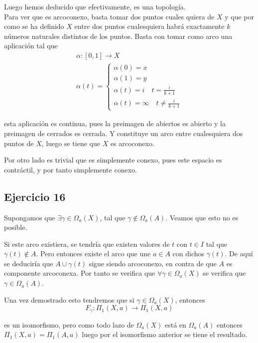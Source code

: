\documentclass{article}
\begin{document}
Luego hemos deducido que efectivamente, es una topología.\\

Para ver que es arcoconexo, basta tomar dos puntos cuales quiera de $X$ y que por como se ha definido $X$ entre dos puntos cualesquiera habrá exactamente $k$ números naturales distintos de los puntos. Basta con tomar como arco una aplicación tal que 
\begin{gather*}
\alpha:[0,1]\rightarrow X\\
\alpha(t)=\left\lbrace\begin{array}{c}
\alpha(0)=x\\
\alpha(1)=y\\
\alpha(t)=i \quad t=\frac{i}{k+1}\\
\alpha(t)=\infty \quad t\neq \frac{i}{k+1}
\end{array}\right.
\end{gather*}

esta aplicación es continua, pues la preimagen de abiertos es abierto y la preimagen de cerrados es cerrada. Y constituye un arco entre cualesquiera dos puntos de $X$, luego se tiene que $X$ es arcoconexo.

Por otro lado es trivial que es simplemente conexo, pues este espacio es contráctil, y por tanto simplemente conexo.

\subsection{Ejercicio 16}
Supongamos que $\exists\gamma \in \Omega_a(X)$, tal que $\gamma\notin \Omega_a(A)$. Veamos que esto no es posible. 

Si este arco existiera, se tendría que existen valores de $t$ con $t\in I$ tal que $\gamma(t)\notin A$. Pero entonces existe el arco que une $a\in A$ con dichos $\gamma(t)$. De aquí se deduciría que $A\cup \gamma(t)$ sigue siendo arcoconexo, en contra de que $A$ es componente arcoconexa. Por tanto se verifica que $\forall \gamma \in \Omega_a(X)$ se verifica que $\gamma \in \Omega_a(A)$. 

Una vez demostrado esto tendremos que si $\gamma\in \Omega_a(X)$, entonces
\begin{equation}
F_\gamma:\Pi_1(X,a)\rightarrow \Pi_1(X,a)
\end{equation}

es un isomorfismo, pero como todo lazo de $\Omega_a(X)$ está en $\Omega_a(A)$ entonces $\Pi_1(X,a)=\Pi_1(A,a)$ luego por el isomorfismo anterior se tiene el resultado.
\end{document}
